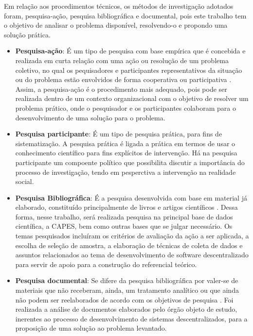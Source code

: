 Em relação aos procedimentos técnicos, os métodos de investigação adotados foram, pesquisa-ação, pesquisa bibliográfica e documental, pois este trabalho tem o objetivo de analisar o problema disponível, resolvendo-o e propondo uma solução prática.

\begin{itemize}
	\item \textbf{Pesquisa-ação}: É um tipo de pesquisa com base empírica que é concebida e realizada em curta relação com uma ação ou resolução de um problema coletivo, no qual os pequisadores e participantes representativos da situação ou do problema estão envolvidos de forma cooperativa ou participativa \cite{thiollent2011metodologia}. Assim, a pesquisa-ação é o procedimento mais adequado, pois pode ser realizada dentro de um contexto organizacional com o objetivo de resolver um problema prático, onde o pesquisador e os participantes colaboram para o desenvolvimento de uma solução para o problema.
	\item \textbf{Pesquisa participante}: É um tipo de pesquisa prática, para fins de sistematização. A pesquisa prática é ligada a prática em termos de usar o conhecimento científico para fins explícitos de intervenção. Há na pesquisa participante um compoente político que possibilita discutir a importância do processo de investigação, tendo em pesperctiva a intervenção na realidade social.
	\item \textbf{Pesquisa Bibliográfica}: É a pesquisa desenvolvida com base em
	material já elaborado, constituído principalmente de livros e artigos científicos \cite{gil2002}. Dessa forma, nesse trabalho, será realizada pesquisa na principal base de dados científica, a CAPES, bem como outras bases que se julgar necessário. Os temas pesquisados incluíram os critérios de avaliação da ação a ser aplicada, a escolha de seleção de amostra, a elaboração de técnicas de coleta de dados e assuntos relacionados ao tema de desenvolvimento de software descentralizado para servir de apoio para a construção do referencial teórico.
	\item \textbf{Pesquisa documental}: Se difere da pesquisa bibliográfica por valer-se de materiais que não receberam, ainda, um tratamento analítico ou que ainda não podem ser reelaborados de acordo com os objetivos de pesquisa \cite{gil2002}. Foi realizada a análise de documentos elaborados pelo órgão objeto de estudo, inerentes ao processo de desenvolvimento de sistemas descentralizados, para a proposição de uma solução ao problema levantado.
\end{itemize}

